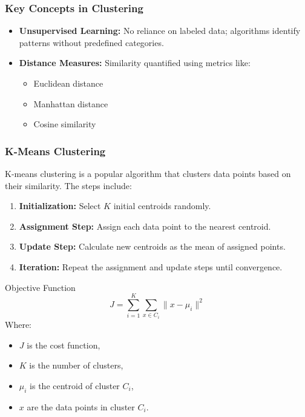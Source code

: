 \documentclass[aspectratio=169]{beamer}
\begin{document}
\begin{frame}[fragile]
    \frametitle{Key Concepts in Clustering}
    \begin{itemize}
        \item \textbf{Unsupervised Learning:} No reliance on labeled data; algorithms identify patterns without predefined categories.
        
        \item \textbf{Distance Measures:} Similarity quantified using metrics like:
        \begin{itemize}
            \item Euclidean distance
            \item Manhattan distance
            \item Cosine similarity
        \end{itemize}
    \end{itemize}
\end{frame}

\begin{frame}[fragile]
    \frametitle{K-Means Clustering}
    K-means clustering is a popular algorithm that clusters data points based on their similarity. The steps include:
    \begin{enumerate}
        \item \textbf{Initialization:} Select \( K \) initial centroids randomly.
        \item \textbf{Assignment Step:} Assign each data point to the nearest centroid.
        \item \textbf{Update Step:} Calculate new centroids as the mean of assigned points.
        \item \textbf{Iteration:} Repeat the assignment and update steps until convergence.
    \end{enumerate}

    \begin{block}{Objective Function}
        \begin{equation}
            J = \sum_{i=1}^{K} \sum_{x \in C_i} \| x - \mu_i \|^2
        \end{equation}
        Where:
        \begin{itemize}
            \item \( J \) is the cost function,
            \item \( K \) is the number of clusters,
            \item \( \mu_i \) is the centroid of cluster \( C_i \),
            \item \( x \) are the data points in cluster \( C_i \).
        \end{itemize}
    \end{block}
\end{frame}
\end{document}

